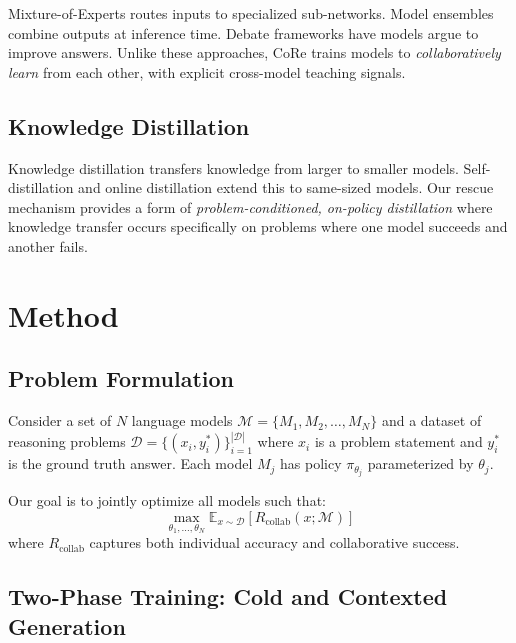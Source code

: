 \documentclass[11pt]{article}
\newcommand{\methodname}{CoRe}
\begin{document}
Mixture-of-Experts \citep{shazeer2017outrageously, fedus2022switch} routes inputs to specialized sub-networks. Model ensembles \citep{jiang2023llmblender} combine outputs at inference time. Debate frameworks \citep{irving2018ai, du2023improving} have models argue to improve answers. Unlike these approaches, \methodname{} trains models to \emph{collaboratively learn} from each other, with explicit cross-model teaching signals.

\subsection{Knowledge Distillation}

Knowledge distillation \citep{hinton2015distilling} transfers knowledge from larger to smaller models. Self-distillation \citep{furlanello2018born} and online distillation \citep{zhang2018deep} extend this to same-sized models. Our rescue mechanism provides a form of \emph{problem-conditioned, on-policy distillation} where knowledge transfer occurs specifically on problems where one model succeeds and another fails.

\section{Method}

\subsection{Problem Formulation}

Consider a set of $N$ language models $\mathcal{M} = \{M_1, M_2, \ldots, M_N\}$ and a dataset of reasoning problems $\mathcal{D} = \{(x_i, y_i^*)\}_{i=1}^{|\mathcal{D}|}$ where $x_i$ is a problem statement and $y_i^*$ is the ground truth answer. Each model $M_j$ has policy $\pi_{\theta_j}$ parameterized by $\theta_j$.

Our goal is to jointly optimize all models such that:
\begin{equation}
    \max_{\theta_1, \ldots, \theta_N} \mathbb{E}_{x \sim \mathcal{D}} \left[ R_{\text{collab}}(x; \mathcal{M}) \right]
\end{equation}
where $R_{\text{collab}}$ captures both individual accuracy and collaborative success.

\subsection{Two-Phase Training: Cold and Contexted Generation}
\end{document}
